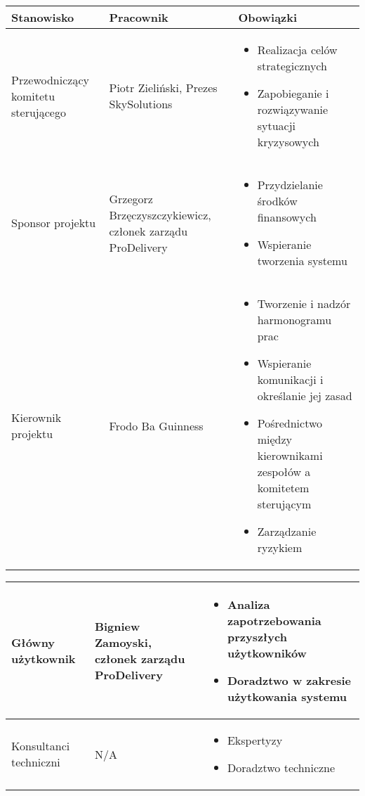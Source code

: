 \documentclass[12pt]{article}
\begin{document}
\begin{tabular}{|p{4.5cm}|p{4.5cm}|p{6.5cm}|} \hline
Stanowisko & Pracownik & Obowiązki \\
\hline \hline
Przewodniczący komitetu sterującego & Piotr Zieliński, Prezes SkySolutions & 
\begin{itemize}
\item Realizacja celów strategicznych
\item Zapobieganie i rozwiązywanie sytuacji kryzysowych
\end{itemize}\\
\hline
Sponsor projektu & Grzegorz Brzęczyszczykiewicz, członek zarządu ProDelivery &
\begin{itemize}
\item Przydzielanie środków finansowych
\item Wspieranie tworzenia systemu
\end{itemize}\\
\hline
Kierownik projektu & Frodo Ba Guinness& 
\begin{itemize}
\item Tworzenie i nadzór harmonogramu prac
\item Wspieranie komunikacji i określanie jej zasad 
\item Pośrednictwo między kierownikami zespołów a komitetem sterującym
\item Zarządzanie ryzykiem
\end{itemize}\\
 \hline
\end{tabular}

\begin{tabular}{|p{4.5cm}|p{4.5cm}|p{6.5cm}|} \hline
Główny użytkownik & Bigniew Zamoyski, członek zarządu ProDelivery & 
\begin{itemize}
\item Analiza zapotrzebowania przyszłych użytkowników
\item Doradztwo w zakresie użytkowania systemu
\end{itemize}\\
 \hline
Konsultanci techniczni & N/A & 
\begin{itemize}
\item Ekspertyzy
\item Doradztwo techniczne
\end{itemize}\\
 \hline
\end{tabular}
\end{document}
